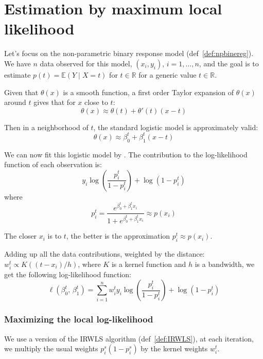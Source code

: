 \pagebreak
\section{Estimation by maximum local likelihood}

Let's focus on the non-parametric binary response model (def~\ref{def:npbinereg}).
We have $n$ data observed for this model, $(x_i, y_i)$, $i = 1, \ldots, n$,
and the goal is to estimate $p(t) = \mathds{E}(Y \mid X = t)$ for $t \in \mathbb{R}$
for a generic value $t \in \mathds{R}$.

Given that $\theta(x)$ is a smooth function, a first order
Taylor expansion of $\theta(x)$ around $t$ gives that for $x$ close to $t$:
\begin{equation*}
    \theta(x) \approx \theta(t) + \theta'(t) (x - t)
\end{equation*}

Then in a neighborhood of $t$, the standard logistic model is approximately
valid:
\begin{equation*}
    \theta(x) \approx \beta_0^t + \beta_1^t (x - t)
\end{equation*}

We can now fit this logistic model by .
The contribution to the log-likelihood function of each observation is:
\begin{equation*}
    y_i\log\left(
        \frac{p_i^t}{1 - p_i^t}
    \right) + \log\left(1 - p_i^t\right)
\end{equation*}
where
\begin{equation*}
    p_i^t = \frac{e^{\beta_0^t + \beta_1^t x_i }}{1 + e^{\beta_0^t + \beta_1^t x_i }}
    \approx p(x_i)
\end{equation*}

The closer $x_i$ is to $t$, the better is the approximation $p_i^t \approx p(x_i)$.

Adding up all the data contributions, weighted by the distance:
$w_i^t \propto K((t - x_i)/h)$, where $K$ is a kernel function and $h$ is a bandwidth,
we get the following log-likelihood function:
\begin{equation*}
    \ell(\beta_0^t,\, \beta_1^t) = \sum_{i = 1}^n w_i^t y_i\log\left(
        \frac{p_i^t}{1 - p_i^t}
    \right) + \log\left(1 - p_i^t\right)
\end{equation*}

\subsubsection{Maximizing the local log-likelihood}
We use a  version of the IRWLS algorithm (def~\ref{def:IRWLS}),
at each iteration, we multiply the usual weights $p_i^s(1 - p_i^s)$ by the
kernel weights $w_i^t$.

